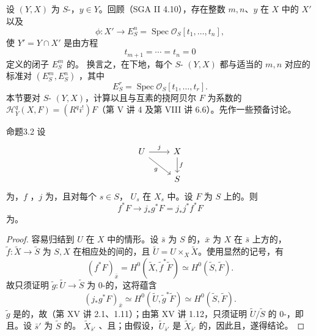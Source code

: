 设 $(Y,X)$ 为 $S$-，$y\in Y$。回顾（SGA II 4.10），存在整数 $m,n$、$y$ 在 $X$ 中的 $X'$ 以及
\[
\phi:X'\longrightarrow E_S^n=\operatorname{Spec}\mathcal O_S[t_1,\ldots,t_n],
\]
使 $Y'=Y\cap X'$ 是由方程
\[
t_{m+1}=\cdots=t_n=0
\]
定义的闭子 $E_S^m$ 的。
换言之，在下地，每个 $S$- $(Y,X)$ 都与适当的 $m,n$ 对应的标准对 $(E_S^m,E_S^n)$ ，其中
\[
E_S^r=\operatorname{Spec}\mathcal O_S[t_1,\ldots,t_r].
\]
本节要对 $S$- $(Y,X)$，计算以且与互素的挠阿贝尔 $F$ 为系数的 $\mathcal H_Y^q(X,F)=(R^qi^!)F$（第 V 讲 4 及第 VIII 讲 6.6）。先作一些预备讨论。
\begin{SGAresult}{命题}{3.2}
设
\[
\begin{tikzcd}
U\arrow[r,"j"]\arrow[dr,"g"']&X\arrow[d,"f"]\\&S
\end{tikzcd}
\]
为，$f$ ，$j$ 为，且对每个 $s\in S$， $U_s$ 在 $X_s$ 中。设 $F$ 为 $S$ 上的。则
\[
f^*F\longrightarrow j_*g^*F=j_*j^*f^*F
\]
为。
\end{SGAresult}
\begin{proof}
容易归结到 $U$ 在 $X$ 中的情形。设 $\bar s$ 为 $S$ 的，$\bar x$ 为 $X$ 在 $\bar s$ 上方的，$\widetilde f:\widetilde X\to\widetilde S$ 为 $S,X$ 在相应处的间的，且 $\widetilde U=U\times_X\widetilde X$。使用显然的记号，有
\[
(f^*F)_{\bar x}=H^0(\widetilde X,\widetilde f^*\widetilde F)\simeq H^0(\widetilde S,\widetilde F).
\]
故只须证明 $\widetilde g:\widetilde U\to\widetilde S$ 为 $0$-的，这将蕴含
\[
(j_*g^*F)_{\bar x}\simeq H^0(\widetilde U,\widetilde g^*\widetilde F)\simeq H^0(\widetilde S,\widetilde F).
\]
$\widetilde g$ 是的，故（第 XV 讲 2.1、1.11）；由第 XV 讲 1.12，只须证明 $\widetilde U/\widetilde S$ 的 $0$-，即且。设 $\bar s'$ 为 $\widetilde S$ 的。 $\widetilde X_{\bar s'}$ 、且；由假设，$\widetilde U_{\bar s'}$ 是 $\widetilde X_{\bar s'}$ 的，因此且，遂得结论。
\end{proof}
